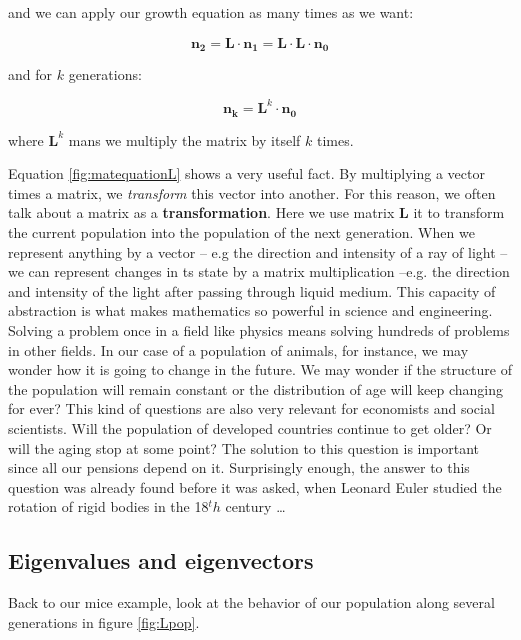 \documentclass[12pt]{article}
\begin{document}
and we can apply our growth equation as many times as we want:

\begin{equation}
	\mathbf{n_{2}} =\mathbf{L} \cdot \mathbf{n_1} = \mathbf{L} \cdot \mathbf{L} \cdot \mathbf{n_0} 
\end{equation}

and for $k$ generations:

\begin{equation}
	\mathbf{n_k} =\mathbf{L}^k \cdot \mathbf{n_0}
\end{equation}

where $\mathbf{L}^k$ mans we multiply the matrix by itself $k$ times.

Equation \ref{fig:matequationL} shows a very useful fact.  By multiplying a vector times a matrix, we \emph{transform} this vector into another. For this reason, we often talk about a matrix as a \textbf{transformation}.  Here we use matrix $\mathbf{L}$ it to transform the current population into the population of the next generation. When we represent anything by a vector -- e.g the direction and intensity of a ray of light -- we can represent changes in ts state by a matrix multiplication --e.g. the direction and intensity of the light after passing through liquid medium. This capacity of abstraction is what makes mathematics so powerful in science and engineering. Solving a problem once in a field like physics means solving hundreds of problems in other fields. In our case of a population of animals, for instance, we may wonder how it is going to change in the future. We may wonder if the structure of the population will remain constant or the distribution of age will keep changing for ever? This kind of questions are also very relevant for economists and social scientists. Will the population of developed countries continue to get older? Or will the aging stop at some point? The solution to this question is important since all our pensions depend on it. Surprisingly enough, the answer to this question was already found before it was asked, when Leonard Euler studied the rotation of rigid bodies in the 18$^th$ century \dots 

\subsection{Eigenvalues and eigenvectors}

Back to our mice example, look at the behavior of our population along several generations in figure \ref{fig:Lpop}.
\end{document}
